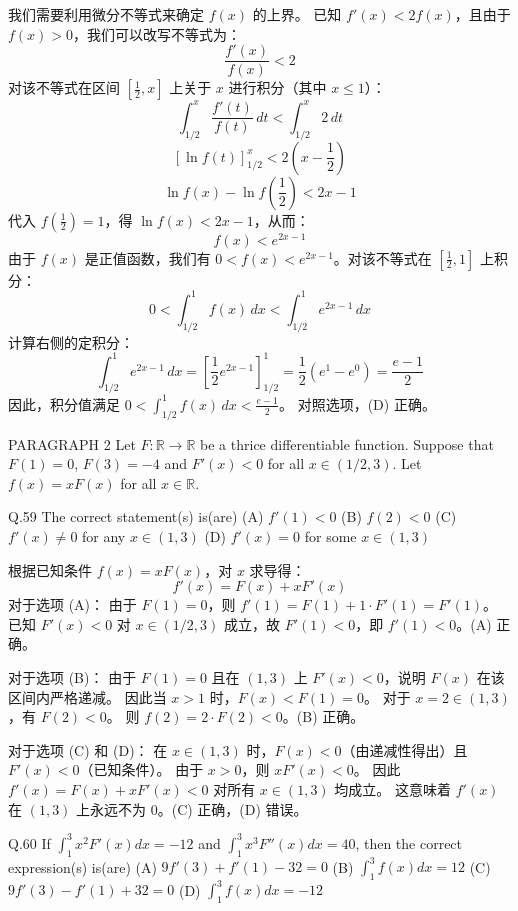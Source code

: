 \begin{questions}
\begin{solution}
我们需要利用微分不等式来确定 $f(x)$ 的上界。
已知 $f'(x) < 2f(x)$，且由于 $f(x) > 0$，我们可以改写不等式为：
\[
\frac{f'(x)}{f(x)} < 2
\]
对该不等式在区间 $\left[ \frac{1}{2}, x \right]$ 上关于 $x$ 进行积分（其中 $x \le 1$）：
\[
\int_{1/2}^{x} \frac{f'(t)}{f(t)} \,dt < \int_{1/2}^{x} 2 \,dt
\]
\[
\left[ \ln f(t) \right]_{1/2}^{x} < 2 \left( x - \frac{1}{2} \right)
\]
\[
\ln f(x) - \ln f\left( \frac{1}{2} \right) < 2x - 1
\]
代入 $f\left( \frac{1}{2} \right) = 1$，得 $\ln f(x) < 2x - 1$，从而：
\[
f(x) < e^{2x-1}
\]
由于 $f(x)$ 是正值函数，我们有 $0 < f(x) < e^{2x-1}$。对该不等式在 $\left[ \frac{1}{2}, 1 \right]$ 上积分：
\[
0 < \int_{1/2}^{1} f(x) \,dx < \int_{1/2}^{1} e^{2x-1} \,dx
\]
计算右侧的定积分：
\[
\int_{1/2}^{1} e^{2x-1} \,dx = \left[ \frac{1}{2} e^{2x-1} \right]_{1/2}^{1} = \frac{1}{2} (e^1 - e^0) = \frac{e - 1}{2}
\]
因此，积分值满足 $0 < \int_{1/2}^{1} f(x) \,dx < \frac{e - 1}{2}$。
对照选项，(D) 正确。
\end{solution}

\question PARAGRAPH 2
Let $F: \mathbb{R} \to \mathbb{R}$ be a thrice differentiable function. Suppose that $F(1) = 0$, $F(3) = -4$ and $F'(x) < 0$ for all $x \in (1/2, 3)$. Let $f(x) = xF(x)$ for all $x \in \mathbb{R}$.

Q.59 The correct statement(s) is(are)
(A) $f'(1) < 0$
(B) $f(2) < 0$
(C) $f'(x) \neq 0$ for any $x \in (1, 3)$
(D) $f'(x) = 0$ for some $x \in (1, 3)$

\begin{solution}
根据已知条件 $f(x) = xF(x)$，对 $x$ 求导得：
\[
f'(x) = F(x) + xF'(x)
\]
对于选项 (A)：
由于 $F(1) = 0$，则 $f'(1) = F(1) + 1 \cdot F'(1) = F'(1)$。
已知 $F'(x) < 0$ 对 $x \in (1/2, 3)$ 成立，故 $F'(1) < 0$，即 $f'(1) < 0$。(A) 正确。

对于选项 (B)：
由于 $F(1) = 0$ 且在 $(1, 3)$ 上 $F'(x) < 0$，说明 $F(x)$ 在该区间内严格递减。
因此当 $x > 1$ 时，$F(x) < F(1) = 0$。
对于 $x = 2 \in (1, 3)$，有 $F(2) < 0$。
则 $f(2) = 2 \cdot F(2) < 0$。(B) 正确。

对于选项 (C) 和 (D)：
在 $x \in (1, 3)$ 时，$F(x) < 0$（由递减性得出）且 $F'(x) < 0$（已知条件）。
由于 $x > 0$，则 $xF'(x) < 0$。
因此 $f'(x) = F(x) + xF'(x) < 0$ 对所有 $x \in (1, 3)$ 均成立。
这意味着 $f'(x)$ 在 $(1, 3)$ 上永远不为 $0$。(C) 正确，(D) 错误。
\end{solution}

\question Q.60 If $\int_1^3 x^2 F'(x) dx = -12$ and $\int_1^3 x^3 F''(x) dx = 40$, then the correct expression(s) is(are)
(A) $9f'(3) + f'(1) - 32 = 0$
(B) $\int_1^3 f(x) dx = 12$
(C) $9f'(3) - f'(1) + 32 = 0$
(D) $\int_1^3 f(x) dx = -12$


\end{questions}
